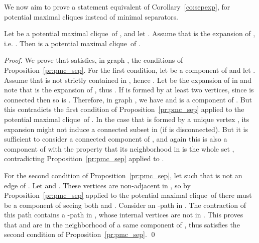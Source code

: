 \documentclass{llncs}
\newcommand{\pmc}{potential maximal clique}
\begin{document}
We now aim to prove a statement equivalent of Corollary~\ref{co:sepexp}, for potential maximal cliques instead of minimal separators. 

\begin{lemma}\label{le:pmcexp}
Let  be a \pmc\ of , and let . Assume that  is the expansion of , i.e. . Then  is a \pmc\ of .
\end{lemma} 
\begin{proof}
We prove that  satisfies, in graph , the conditions of Proposition~\ref{pr:pmc_sep}. For the first condition, let  be a component of  and let . Assume that  is not strictly contained in , hence . Let  be the expansion of  in  and note that  is the expansion of , thus . If  is formed by at least two vertices, since  is connected then so is .  Therefore, in graph , we have  and  is a component of . But this contradicts the first condition of Proposition~\ref{pr:pmc_sep} applied to the \pmc\  of . In the case that  is formed by a unique vertex , its expansion  might not induce a connected subset in  (if  is disconnected). But it is sufficient to consider a connected component  of , and again this is also a component of  with the property that its neighborhood in  is the whole set , contradicting Proposition~\ref{pr:pmc_sep} applied to .

For the second condition of Proposition~\ref{pr:pmc_sep}, let  such that  is not an edge of . Let  and . These vertices are non-adjacent in , so by Proposition~\ref{pr:pmc_sep} applied to the \pmc\  of  there must be a component  of  seeing both  and . Consider an -path in . The contraction of this path contains a -path in , whose internal vertices are not in . This proves that  and  are in the neighborhood of a same component of , thus  satisfies the second condition of Proposition~\ref{pr:pmc_sep}.
\qed
\end{proof}
\end{document}

